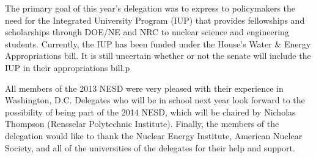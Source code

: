 \documentclass[12pt]{article}
\begin{document}
The primary goal of this year’s delegation was to express to policymakers the
need for the Integrated University Program (IUP) that provides fellowships and
scholarships through DOE/NE and NRC to nuclear science and engineering
students. Currently, the IUP has been funded under the House's Water \& Energy
Appropriations bill. It is still uncertain whether or not the senate will
include the IUP in their appropriations bill.p

All members of the 2013 NESD were very pleased with their experience in
Washington, D.C. Delegates who will be in school next year look forward to the
possibility of being part of the 2014 NESD, which will be chaired by Nicholas
Thompson (Rensselar Polytechnic Institute). Finally, the members of the
delegation would like to thank the Nuclear Energy Institute, American Nuclear
Society, and all of the universities of the delegates for their help and
support.
\end{document}

